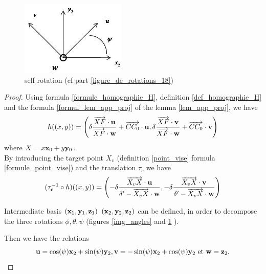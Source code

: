 \begin{figure}[h!]
\centering
\includegraphics[width=5cm]{graphe3.jpg}
\caption{self rotation (cf part \ref{figure_de_rotations_18})}
\label{decompgeo_rotationPropre}
\end{figure}





\begin{proof}
Using formula \ref{formule_homographie_H}, definition \ref{def_homographie_H} and the formula \ref{formul_lem_app_proj} of the lemma \ref{lem_app_proj}, we have
\begin{equation*}
h((x,y))=\left( \delta \frac{\overrightarrow{XF}\cdot \mathbf{u}}{\overrightarrow{XF} \cdot \mathbf{w}} +\overrightarrow{CC_0 } \cdot \mathbf{u}, \delta \frac{\overrightarrow{XF}\cdot \mathbf{v}}{\overrightarrow{XF} \cdot  \mathbf{w}}+\overrightarrow{CC_0 }\cdot \mathbf{v} \right)
\end{equation*}
where $X=x \mathbf{x}_0 + y \mathbf{y}_0 $.\\

By introducing the target point $X_v$ (definition \ref{point_vise} formula \ref{formule_point_vise}) and the translation $\tau_c$ we have
\begin{equation}
(\tau_{\mathbf{c}}^{-1} \circ h)((x,y)) = \left ( -\delta \frac{\overrightarrow{X_vX}\cdot \mathbf{u}}{\delta' -\overrightarrow{X_vX} \cdot \mathbf{w}},-\delta \frac{\overrightarrow{X_vX}\cdot \mathbf{v}}{\delta' -\overrightarrow{X_vX} \cdot \mathbf{w}} \right)
\label{decomp_formul_intermediaire_1}
\end{equation}


Intermediate basis $(\mathbf{x}_1 ,\mathbf{y}_1 ,\mathbf{z}_1)$  $(\mathbf{x}_2 ,\mathbf{y}_2 ,\mathbf{z}_2)$ can be defined, in order to decompose the three rotations $\phi,\theta,\psi$ (figures \ref{img_angles} and \ref{decompgeo_rotationPropre} ).

Then we have the relations
\begin{equation*}
\mathbf{u}=\cos(\psi)\mathbf{x}_{2}+\sin(\psi)\mathbf{y}_{2} , \mathbf{v}=-\sin(\psi)\mathbf{x}_{2}+\cos(\psi)\mathbf{y}_{2} \text{ et } \mathbf{w}=\mathbf{z}_2.
\end{equation*}


\end{proof}
